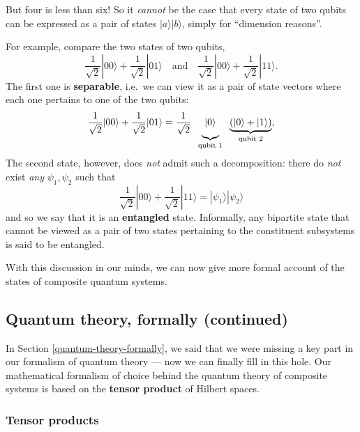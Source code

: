 \documentclass[fleqn,a4paper]{article}
\theoremstyle{definition}
\theoremstyle{definition}
\theoremstyle{definition}
\theoremstyle{definition}
\theoremstyle{remark}
\begin{document}
But four is less than six!
So it \emph{cannot} be the case that every state of two qubits can be expressed as a pair of states \(|a\rangle|b\rangle\), simply for ``dimension reasons''.

For example, compare the two states of two qubits,
\[
  \frac{1}{\sqrt{2}}|00\rangle + \frac{1}{\sqrt{2}}|01\rangle
  \quad\text{and}\quad
  \frac{1}{\sqrt{2}}|00\rangle + \frac{1}{\sqrt{2}}|11\rangle.
\]
The first one is \textbf{separable}, i.e.~we can view it as a pair of state vectors where each one pertains to one of the two qubits:
\[
  \frac{1}{\sqrt{2}}|00\rangle + \frac{1}{\sqrt{2}}|01\rangle
  = \frac{1}{\sqrt{2}}
  \;\;
  \underbrace{\vphantom{\frac{1}{\sqrt{2}}}|0\rangle}_{\text{qubit 1}}
  \;\;
  \underbrace{(|0\rangle+|1\rangle)}_{\text{qubit 2}},
\]
The second state, however, does \emph{not} admit such a decomposition: there do \emph{not} exist \emph{any} \(\psi_1,\psi_2\) such that
\[
  \frac{1}{\sqrt{2}}|00\rangle + \frac{1}{\sqrt{2}}|11\rangle
  = |\psi_1\rangle|\psi_2\rangle
\]
and so we say that it is an \textbf{entangled} state.
Informally, any bipartite state that cannot be viewed as a pair of two states pertaining to the constituent subsystems is said to be entangled.

With this discussion in our minds, we can now give more formal account of the states of composite quantum systems.

\hypertarget{quantum-theory-formally-continued}{%
\subsection{Quantum theory, formally (continued)}\label{quantum-theory-formally-continued}}

In Section \ref{quantum-theory-formally}, we said that we were missing a key part in our formalism of quantum theory --- now we can finally fill in this hole.
Our mathematical formalism of choice behind the quantum theory of composite systems is based on the \textbf{tensor product} of Hilbert spaces.

\hypertarget{tensor-products}{%
\subsubsection{Tensor products}\label{tensor-products}}
\end{document}
